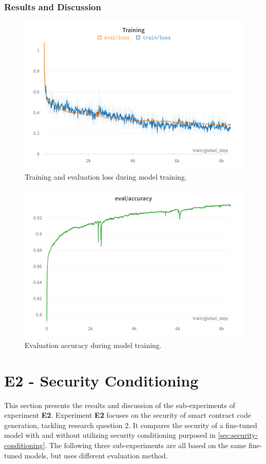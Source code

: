 \subsubsection{Results and Discussion}


\begin{figure}[htp]
    \centering
    \includegraphics[width=\textwidth]{figures/wandb-train-loss-gpt-j-smart-contract.png}
    \caption{Training and evaluation loss during model training.}
\end{figure}

\begin{figure}[htp]
    \centering
    \includegraphics[width=\textwidth]{figures/wandb-train-eval-gpt-j-smart-contract.png}
    \caption{Evaluation accuracy during model training.}
\end{figure}


\section{E2 - Security Conditioning}
\label{sec:e2-security-conditioning}
This section presents the results and discussion of the sub-experiments of experiment \textbf{E2}. Experiment \textbf{E2} focuses on the security of smart contract code generation, tackling research question 2. It compares the security of a fine-tuned model with and without utilizing security conditioning purposed in \cref{sec:security-conditioning}. The following three sub-experiments are all based on the same fine-tuned models, but uses different evaluation method.

